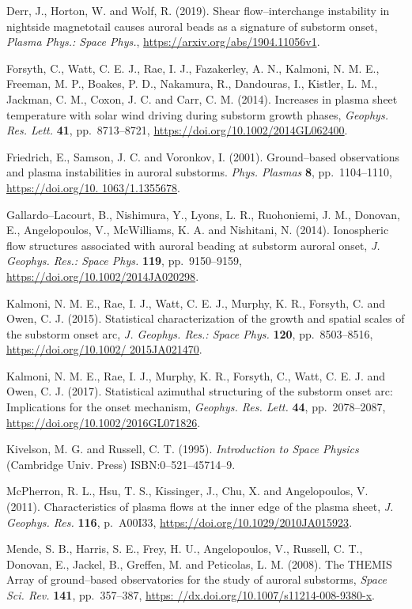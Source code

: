 \documentclass[a4paper,openany,12pt]{book}
\begin{document}
\begin{thebibliography}{100}
\bibitem{}
Derr, J., Horton, W. and Wolf, R. (2019). Shear flow--interchange instability in nightside magnetotail causes auroral beads as a signature of substorm onset, \emph{Plasma Phys.: Space Phys.}, 
\url{https://arxiv.org/abs/1904.11056v1}.

\bibitem{}
Forsyth, C., Watt, C. E. J., Rae, I. J., Fazakerley, A. N., Kalmoni, N. M. E., Freeman, M. P., Boakes, P. D., Nakamura, R., Dandouras, I., Kistler, L. M., Jackman, C. M., Coxon, J. C. and Carr, C. M. (2014). Increases in plasma sheet temperature with solar wind driving during substorm growth phases, \emph{Geophys. Res. Lett.} \textbf{41}, 
pp.~8713--8721, \url{https://doi.org/10.1002/2014GL062400}.

\bibitem{}
Friedrich, E., Samson, J. C. and Voronkov, I. (2001). Ground--based observations and plasma instabilities in auroral substorms. \emph{Phys. Plasmas} \textbf{8}, pp.~1104--1110, \url{https://doi.org/10. 1063/1.1355678}.

\bibitem{}
Gallardo--Lacourt, B., Nishimura, Y., Lyons, L. R., Ruohoniemi, J. M., Donovan, E., Angelopoulos, V., McWilliams, K. A. and Nishitani, N. (2014). Ionospheric flow structures associated with auroral beading at substorm auroral onset, \emph{J. Geophys. Res.: Space Phys.} \textbf{119}, pp.~9150--9159, \url{https://doi.org/10.1002/2014JA020298}.

\bibitem{}
Kalmoni, N. M. E., Rae, I. J., Watt, C. E. J., Murphy, K. R., Forsyth, C. and Owen, C. J. (2015). Statistical characterization of the growth and spatial scales of the substorm onset arc, \emph{J. Geophys. Res.: Space Phys.} \textbf{120}, pp.~8503--8516, \url{https://doi.org/10.1002/ 2015JA021470}.

\bibitem{}
Kalmoni, N. M. E., Rae, I. J., Murphy, K. R., Forsyth, C., Watt, C. E. J. and Owen, C. J. (2017). 
Statistical azimuthal structuring of the substorm onset arc: Implications for the onset mechanism, \emph{Geophys. Res. Lett.} \textbf{44}, pp.~2078--2087, \url{https://doi.org/10.1002/2016GL071826}.

\bibitem{}
Kivelson, M. G. and Russell, C. T. (1995). \emph{Introduction to Space Physics} (Cambridge Univ. Press) ISBN:0--521--45714--9.

\bibitem{}
McPherron, R. L., Hsu, T. S., Kissinger, J., Chu, X. and Angelopoulos, V. (2011). Characteristics of plasma flows at the inner edge of the plasma sheet, \emph{J. Geophys. Res.} \textbf{116}, p.~A00I33, 
\url{https://doi.org/10.1029/2010JA015923}.

\bibitem{}
Mende, S. B., Harris, S. E., Frey, H. U., Angelopoulos, V., Russell, C. T., Donovan, E., Jackel, B., Greffen, M. and Peticolas, L. M. (2008). The THEMIS Array of ground--based observatories for the study of auroral substorms, 
\emph{Space Sci. Rev.} \textbf{141}, pp.~357--387, \url{https: //dx.doi.org/10.1007/s11214-008-9380-x}.


\end{thebibliography}
\end{document}
